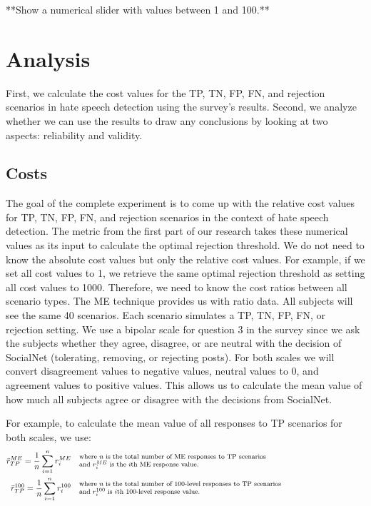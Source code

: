 \documentclass[a4paper]{article}
\begin{document}
**Show a numerical slider with values between 1 and 100.**\\

\section{Analysis}
First, we calculate the cost values for the TP, TN, FP, FN, and rejection scenarios in hate speech detection using the survey's results. Second, we analyze whether we can use the results to draw any conclusions by looking at two aspects: reliability and validity.

\subsection{Costs}
The goal of the complete experiment is to come up with the relative cost values for TP, TN, FP, FN, and rejection scenarios in the context of hate speech detection. The metric from the first part of our research takes these numerical values as its input to calculate the optimal rejection threshold. We do not need to know the absolute cost values but only the relative cost values. For example, if we set all cost values to 1, we retrieve the same optimal rejection threshold as setting all cost values to 1000. Therefore, we need to know the cost ratios between all scenario types. The ME technique provides us with ratio data. All subjects will see the same 40 scenarios. Each scenario simulates a TP, TN, FP, FN, or rejection setting. We use a bipolar scale for question 3 in the survey since we ask the subjects whether they agree, disagree, or are neutral with the decision of SocialNet (tolerating, removing, or rejecting posts). For both scales we will convert disagreement values to negative values, neutral values to 0, and agreement values to positive values. This allows us to calculate the mean value of how much all subjects agree or disagree with the decisions from SocialNet.

For example, to calculate the mean value of all responses to TP scenarios for both scales, we use:
\begin{align*}
    \bar{r}_{TP}^{ME} = \frac{1}{n} \sum_{i=1}^{n} r_i^{ME}   & \quad  \parbox{35em}{\footnotesize where $n$ is the total number of ME responses to TP scenarios       \\and $r_i^{ME}$ is the $i$th ME response value.}\\
    \bar{r}_{TP}^{100} = \frac{1}{n} \sum_{i=1}^{n} r_i^{100} & \quad \parbox{35em}{\footnotesize where $n$ is the total number of 100-level responses to TP scenarios \\and $r_i^{100}$ is $i$th 100-level response value.}
\end{align*}
\end{document}

